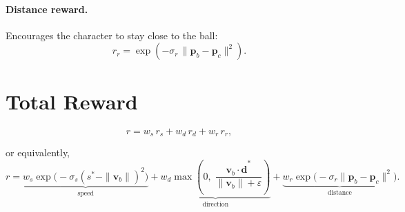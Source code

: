 \documentclass[11pt]{article}
\begin{document}
\paragraph{Distance reward.} Encourages the character to stay close to the ball:
\begin{equation}
    r_r = \exp\!\left(-\sigma_r \, \|\mathbf{p}_b - \mathbf{p}_c\|^2\right).
\end{equation}

\section*{Total Reward}

\begin{equation}
    r = w_s \, r_s + w_d \, r_d + w_r \, r_r,
\end{equation}

or equivalently,
\begin{equation}
    r = \underbrace{w_s \exp\!\bigl(-\sigma_s (s^* - \|\mathbf{v}_b\|)^2\bigr)}_{\text{speed}}
      + \underbrace{w_d \max\!\left(0,\; \frac{\mathbf{v}_b \cdot \hat{\mathbf{d}}^*}{\|\mathbf{v}_b\| + \varepsilon}\right)}_{\text{direction}}
      + \underbrace{w_r \exp\!\bigl(-\sigma_r \|\mathbf{p}_b - \mathbf{p}_c\|^2\bigr)}_{\text{distance}}.
\end{equation}
\end{document}

